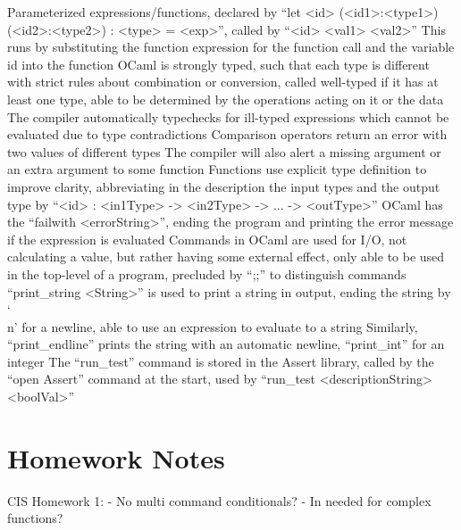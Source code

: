 \documentclass[11 pt, twoside]{article}
\newenvironment{outline*}
{
	\begin{outline}[enumerate]
	}
	{\end{outline}
}
\begin{document}
\begin{outline*}
\2 Parameterized expressions/functions, declared by ``let <id> (<id1>:<type1>) (<id2>:<type2>) : <type> = <exp>'', called by ``<id> <val1> <val2>''
\3 This runs by substituting the function expression for the function call and the variable id into the function
\1 OCaml is strongly typed, such that each type is different with strict rules about combination or conversion, called well-typed if it has at least one type, able to be determined by the operations acting on it or the data
\2 The compiler automatically typechecks for ill-typed expressions which cannot be evaluated due to type contradictions
\3 Comparison operators return an error with two values of different types
\3 The compiler will also alert a missing argument or an extra argument to some function
\2 Functions use explicit type definition to improve clarity, abbreviating in the description the input types and the output type by ``<id> : <in1Type> -> <in2Type> -> ... -> <outType>''
\1 OCaml has the ``failwith <errorString>'', ending the program and printing the error message if the expression is evaluated
\1 Commands in OCaml are used for I/O, not calculating a value, but rather having some external effect, only able to be used in the top-level of a program, precluded by ``;;'' to distinguish commands
\2 ``print_string <String>'' is used to print a string in output, ending the string by `\\n' for a newline, able to use an expression to evaluate to a string
\3 Similarly, ``print_endline'' prints the string with an automatic newline, ``print_int'' for an integer
\2 The ``run\_test'' command is stored in the Assert library, called by the ``open Assert'' command at the start, used by ``run_test <descriptionString> <boolVal>''
\end{outline*}
\section{Homework Notes}
CIS Homework 1:
- No multi command conditionals?
- In needed for complex functions?
\end{document}
